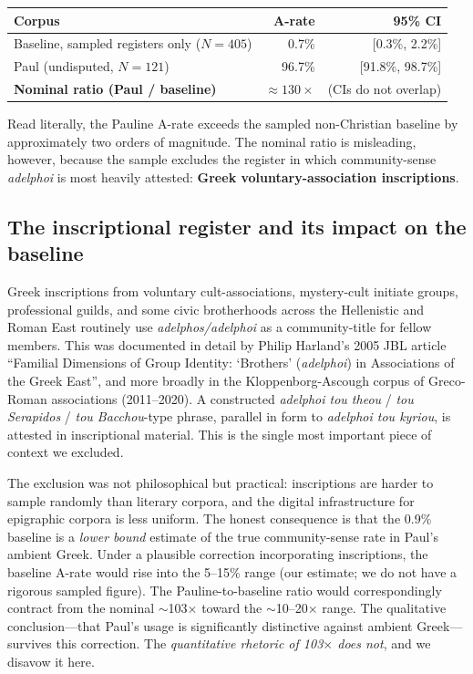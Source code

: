 \documentclass[11pt,oneside]{article}
\begin{document}
\begin{center}
\begin{tabular}{lrr}
\toprule
Corpus & A-rate & 95\% CI \\
\midrule
Baseline, sampled registers only ($N=405$)  & 0.7\%  & [0.3\%, 2.2\%] \\
Paul (undisputed, $N=121$)                  & 96.7\% & [91.8\%, 98.7\%] \\
\midrule
\textbf{Nominal ratio (Paul / baseline)}    & \textbf{$\approx 130\times$} & (CIs do not overlap) \\
\bottomrule
\end{tabular}
\end{center}

Read literally, the Pauline A-rate exceeds the sampled non-Christian
baseline by approximately two orders of magnitude.  The nominal ratio
is misleading, however, because the sample excludes the register in
which community-sense \textit{adelphoi} is most heavily attested:
\textbf{Greek voluntary-association inscriptions}.

\subsection*{The inscriptional register and its impact on the baseline}

Greek inscriptions from voluntary cult-associations, mystery-cult
initiate groups, professional guilds, and some civic brotherhoods
across the Hellenistic and Roman East routinely use
\textit{adelphos/adelphoi} as a community-title for fellow members.
This was documented in detail by Philip Harland's 2005 JBL article
\enquote{Familial Dimensions of Group Identity: `Brothers'
(\textit{adelphoi}) in Associations of the Greek East}, and more
broadly in the Kloppenborg-Ascough corpus of Greco-Roman associations
(2011--2020).  A constructed \textit{adelphoi tou theou} / \textit{tou
Serapidos} / \textit{tou Bacchou}-type phrase, parallel in form to
\textit{adelphoi tou kyriou}, is attested in inscriptional material.
This is the single most important piece of context we excluded.

The exclusion was not philosophical but practical: inscriptions are
harder to sample randomly than literary corpora, and the digital
infrastructure for epigraphic corpora is less uniform.  The honest
consequence is that the 0.9\% baseline is a \textit{lower bound}
estimate of the true community-sense rate in Paul's ambient Greek.
Under a plausible correction incorporating inscriptions, the baseline
A-rate would rise into the 5--15\% range (our estimate; we do not
have a rigorous sampled figure).  The Pauline-to-baseline ratio would
correspondingly contract from the nominal $\sim$103$\times$ toward the
$\sim$10--20$\times$ range.  The qualitative conclusion---that Paul's
usage is significantly distinctive against ambient Greek---survives
this correction.  The \textit{quantitative rhetoric of 103$\times$
does not}, and we disavow it here.
\end{document}
